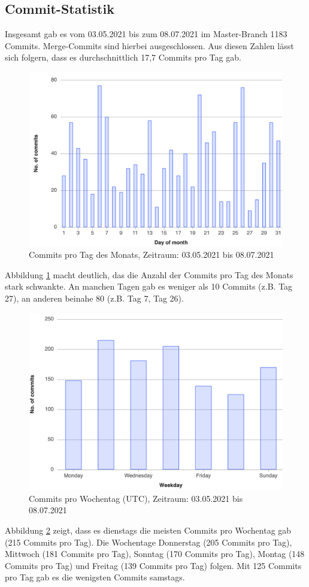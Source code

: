 \documentclass[../review_3.tex]{subfiles}
\begin{document}
\subsection{Commit-Statistik}
Insgesamt gab es vom 03.05.2021 bis zum 08.07.2021 im Master-Branch 1183 Commits. Merge-Commits sind hierbei ausgeschlossen. Aus diesen Zahlen lässt sich folgern, dass es durchschnittlich 17,7 Commits pro Tag gab.
\begin{figure} [h]
    \centering
    \includegraphics[width =0.65\linewidth]{img/gitlab2.png}
    \caption{Commits pro Tag des Monats, Zeitraum: 03.05.2021 bis 08.07.2021}
    \label{gitlab2}
\end{figure}
Abbildung \ref{gitlab2} macht deutlich, das die Anzahl der Commits pro Tag des Monats stark schwankte. An manchen Tagen gab es weniger als 10 Commits (z.B. Tag 27), an anderen beinahe 80 (z.B. Tag 7, Tag 26).
\begin{figure} [h]
    \centering
    \includegraphics[width =0.55\linewidth]{img/gitlab3.png}
    \caption{Commits pro Wochentag (UTC), Zeitraum: 03.05.2021 bis 08.07.2021}
    \label{gitlab3}
\end{figure}
Abbildung \ref{gitlab3} zeigt, dass es dienstags die meisten Commits pro Wochentag gab (215 Commits pro Tag). Die Wochentage Donnerstag (205 Commits pro Tag), Mittwoch (181 Commits pro Tag), Sonntag (170 Commits pro Tag), Montag (148 Commits pro Tag) und Freitag (139 Commits pro Tag) folgen. Mit 125 Commits pro Tag gab es die wenigsten Commits samstags.
\end{document}
